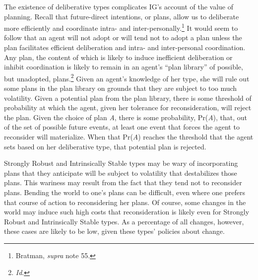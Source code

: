 The existence of deliberative types complicates IG's account of the
value of planning. Recall that future-direct intentions, or plans, allow
us to deliberate more efficiently and coordinate intra- and
inter-personally.\footnote{Bratman, \emph{supra} note 55.} It would seem
to follow that an agent will not adopt or will tend not to adopt a plan
unless the plan facilitates efficient deliberation and intra- and
inter-personal coordination. Any plan, the content of which is likely to
induce inefficient deliberation or inhibit coordination is likely to
remain in an agent's ``plan library'' of possible, but unadopted,
plans.\footnote{\emph{Id}.} Given an agent's knowledge of her type, she
will rule out some plans in the plan library on grounds that they are
subject to too much volatility. Given a potential plan from the plan
library, there is some threshold of probability at which the agent,
given her tolerance for reconsideration, will reject the plan. Given the
choice of plan \emph{A}, there is some probability, Pr(\emph{A}), that,
out of the set of possible future events, at least one event that forces
the agent to reconsider will materialize. When that Pr(\emph{A}) reaches
the threshold that the agent sets based on her deliberative type, that
potential plan is rejected.

Strongly Robust and Intrinsically Stable types may be wary of
incorporating plans that they anticipate will be subject to volatility
that destabilizes those plans. This wariness may result from the fact
that they tend not to reconsider plans. Bending the world to one's plans
can be difficult, even where one prefers that course of action to
reconsidering her plans. Of course, some changes in the world may induce
such high costs that reconsideration is likely even for Strongly Robust
and Intrinsically Stable types. As a percentage of all changes, however,
these cases are likely to be low, given these types' policies about
change.

